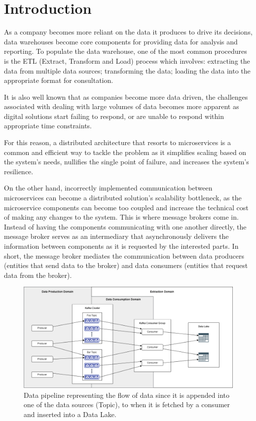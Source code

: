\chapter{Introduction} \label{chap:intro}

As a company becomes more reliant on the data it produces to drive its
decisions, data warehouses become core components for providing data for
analysis and reporting. To populate the data warehouse, one of the most common
procedures is the ETL (Extract, Transform and Load) process which involves:
extracting the data from multiple data sources; transforming the data; loading
the data into the appropriate format for consultation.

It is also well known that as companies become more data driven,
the challenges associated with dealing with large volumes of data becomes more
apparent as digital solutions start failing to respond, or are unable to respond
within appropriate time constraints. 

For this reason, a distributed architecture that resorts to microservices is a
common and efficient way to tackle the problem as it simplifies scaling based on
the system's needs, nullifies the single point of failure, and increases the
system's resilience. 

On the other hand, incorrectly implemented communication between microservices
can become a distributed solution's scalability bottleneck, as the microservice
components can become too coupled and increase the technical cost of making any
changes to the system.  This is where message brokers come in.  Instead of
having the components communicating with one another directly, the message
broker serves as an intermediary that asynchronously delivers the information
between components as it is requested by the interested parts. In short, the
message broker mediates the communication between data producers (entities that
send data to the broker) and data consumers (entities that request data from
the broker). 

\begin{figure}[htb!]
    \centering
    \includegraphics[width=\textwidth]{images/introduction/Context.png}
\caption{
    Data pipeline representing the flow of data since it is appended into one of
    the data sources (Topic), to when it is fetched by a consumer and inserted
    into a Data Lake.
}
\label{fig:problem_context}
\end{figure}

